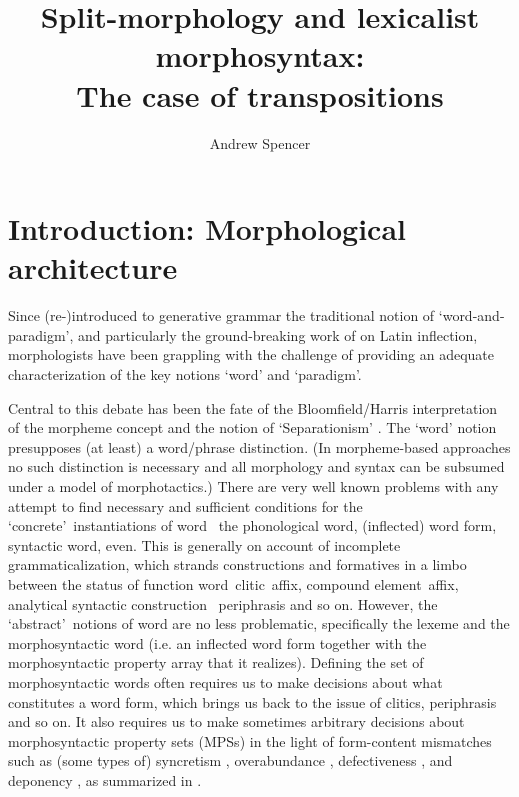 \documentclass[output=paper,
modfonts
]{LSP/langsci}
\author{Andrew Spencer\affiliation{University of Essex}}
\title{Split-morphology and lexicalist morphosyntax:\\The case of transpositions}
\begin{document}
\maketitle

\section{Introduction: Morphological architecture}\label{sec:architecture}

Since \textcite{AndersonSR77:inflection}
(re-)introduced to generative grammar the traditional notion of ‘word-and-paradigm’, 
and particularly the ground-breaking work of  \textcite{Matthews72}
on  Latin  %
inflection, morphologists have been grappling with the challenge of providing an adequate characterization of the key notions ‘word’ and ‘paradigm’.%

Central to this debate has been the fate of the Bloomfield/Harris %
interpretation of the morpheme 
concept  \parencite{AndersonSR15:morpheme}
and the notion of ‘Separationism’  
\parencite{Beard95:book}.
The ‘word’ notion presupposes (at least) a word/phrase distinction. (In morpheme-based approaches no such distinction is necessary and all morphology and syntax can be subsumed under a model of morphotactics.) There are very well known problems with any attempt to find necessary and sufficient conditions for the \textquoteleft concrete\textquoteright\ instantiations of word \textemdash\ the phonological word, (inflected) word form, syntactic word, even. This is generally on account of incomplete grammaticalization, which strands constructions and formatives in a limbo between the status of function word\textendash\ clitic\textendash\ affix,
compound element\textendash\ affix, analytical syntactic construction \textendash\  periphrasis
and so on. However, the \textquoteleft abstract\textquoteright\ notions of word are no less problematic, specifically the lexeme and the morphosyntactic word (i.e. an inflected word form together with the morphosyntactic property array that it realizes).  Defining the set of morphosyntactic words often requires us to make decisions about what constitutes a word form, which brings us back to the issue of clitics, periphrasis and so on. It also requires us to make sometimes arbitrary decisions about morphosyntactic property sets (MPSs) in the light of form-content mismatches such as (some types of) syncretism \parencite{Baerman:etal05:book}, %
overabundance \parencite{Thornton12:overabundance}, %
defectiveness \parencite{Sims15:book}, %
and deponency  \parencite{Baerman:etal07}, %
as summarized in \textcite{Stump16:book}.
\end{document}
